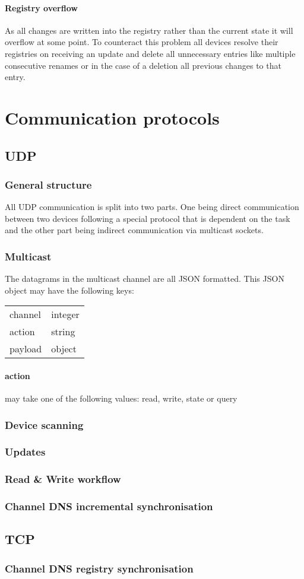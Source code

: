 \documentclass[a4paper]{article}
\begin{document}
        \paragraph{Registry overflow} As all changes are written into the registry rather than the current state it will
            overflow at some point. To counteract this problem all devices resolve their registries on receiving an
            update and delete all unnecessary entries like multiple consecutive renames or in the case of a deletion all
            previous changes to that entry.
    \section{Communication protocols}
        \subsection{UDP}
	        \subsubsection{General structure}
		        All UDP communication is split into two parts. One being direct communication between two devices
		        following a special protocol that is dependent on the task and the other part being indirect
		        communication via multicast sockets.
		    \subsubsection{Multicast}
			    The datagrams in the multicast channel are all JSON formatted. This JSON object may have the following
			    keys:\\
			    \begin{tabular}{l | l}
			        channel & integer\\
			    	action & string\\
			    	payload & object
			    \end{tabular}
			    \paragraph{action} may take one of the following values: read, write, state or query
	        \subsubsection{Device scanning}
            \subsubsection{Updates}
            \subsubsection{Read \& Write workflow}
            \subsubsection{Channel DNS incremental synchronisation}
        \subsection{TCP}
            \subsubsection{Channel DNS registry synchronisation}
\end{document}
